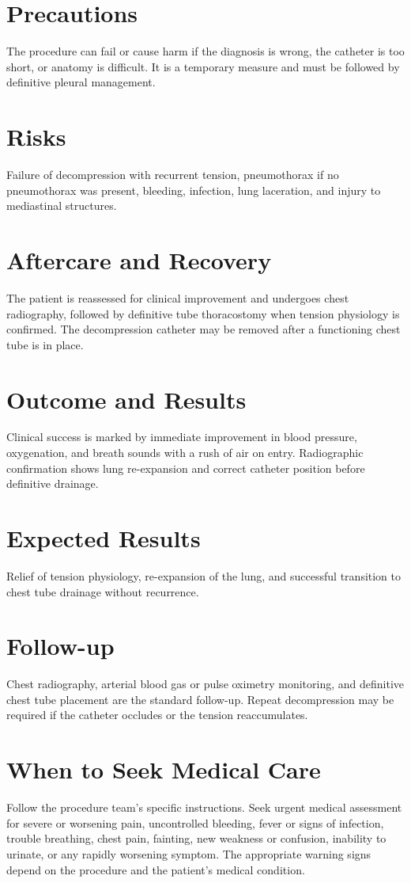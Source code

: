 \section*{Precautions}
The procedure can fail or cause harm if the diagnosis is wrong, the catheter is too short, or anatomy is difficult. It is a temporary measure and must be followed by definitive pleural management.

\section*{Risks}
Failure of decompression with recurrent tension, pneumothorax if no pneumothorax was present, bleeding, infection, lung laceration, and injury to mediastinal structures.

\section*{Aftercare and Recovery}
The patient is reassessed for clinical improvement and undergoes chest radiography, followed by definitive tube thoracostomy when tension physiology is confirmed. The decompression catheter may be removed after a functioning chest tube is in place.

\section*{Outcome and Results}
Clinical success is marked by immediate improvement in blood pressure, oxygenation, and breath sounds with a rush of air on entry. Radiographic confirmation shows lung re-expansion and correct catheter position before definitive drainage.

\section*{Expected Results}
Relief of tension physiology, re-expansion of the lung, and successful transition to chest tube drainage without recurrence.

\section*{Follow-up}
Chest radiography, arterial blood gas or pulse oximetry monitoring, and definitive chest tube placement are the standard follow-up. Repeat decompression may be required if the catheter occludes or the tension reaccumulates.

\section*{When to Seek Medical Care}
Follow the procedure team's specific instructions. Seek urgent medical assessment for severe or worsening pain, uncontrolled bleeding, fever or signs of infection, trouble breathing, chest pain, fainting, new weakness or confusion, inability to urinate, or any rapidly worsening symptom. The appropriate warning signs depend on the procedure and the patient's medical condition.

